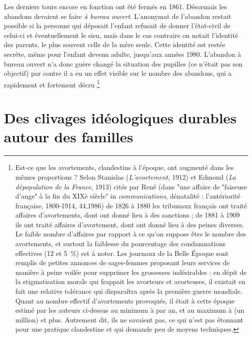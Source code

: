 Les derniers tours encore en fonction ont été fermés en 1861. Désormais les abandons devaient se faire \emph{à bureau ouvert}. L'anonymat de l'abandon restait possible si la personne qui déposait l'enfant refusait de donner l'état-civil de celui-ci et éventuellement le sien, mais dans le cas contraire on notait l'identité des parents, le plus souvent celle de la mère seule. Cette identité est restée secrète, même pour l'enfant devenu adulte, jusqu'aux années 1980. L'abandon à bureau ouvert n'a donc guère changé la situation des pupilles (ce n'était pas son objectif) par contre il a eu un effet visible sur le nombre des abandons, qui a rapidement et fortement décru%
\footnote{Est-ce que les avortements, clandestins à l'époque, ont augmenté dans les mêmes proportions ? Selon Stanislas  (\emph{L'avortement}, 1912) et Edmond  (\emph{La dépopulation de la France}, 1913) cités par René  (dans "une affaire de "faiseuse d'ange" à la fin du XIXè siècle" in \emph{communications}, dénatalité : l'antériorité française, 1800-1914, 44,1986) de 1826 à 1880 les tribunaux français ont traité  affaires d'avortements, dont  ont donné lieu à des sanctions ; de 1881 à 1909 ils ont traité  affaires d'avortement, dont  ont donné lieu à des peines diverses. Le faible nombre d'affaires par rapport à ce qu'on suppose être le nombre des avortements, et surtout la faiblesse du pourcentage des condamnations effectives (12 et 5~\%) est à noter. Les journaux de la Belle Époque sont remplis de petites annonces de sages-femmes proposant leurs services de manière à peine voilée pour supprimer les grossesses indésirables : en dépit de la stigmatisation morale qui frappait les avorteurs et avorteuses, il existait en fait une relative tolérance qui disparaîtra après la première guerre mondiale. Quant au nombre effectif d'avortements provoqués, il était à cette époque estimé par les auteurs ci-dessus au minimum à  par an, et au maximum à  (un million) et plus. Autrement dit, ils ne savaient pas, ce qui n'est pas étonnant pour une pratique clandestine et qui demande peu de moyens techniques.}%


\section{Des clivages idéologiques durables autour des familles}

